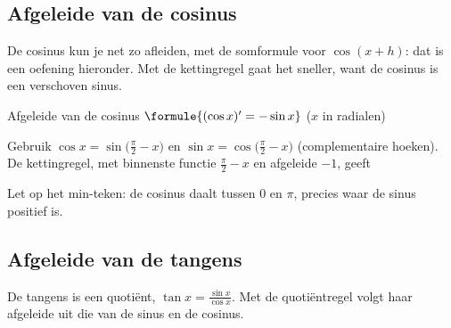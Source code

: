 \begin{oefeningen}
\end{oefeningen}

\subsection{Afgeleide van de cosinus}

De cosinus kun je net zo afleiden, met de somformule voor $\cos(x + h)$: dat is een oefening hieronder. Met de kettingregel gaat het sneller, want de cosinus is een verschoven sinus.

\begin{theorie}
\begin{stelling}{Afgeleide van de cosinus}
$\formule{(\cos x)' = -\sin x}$ \qquad ($x$ in radialen)
\end{stelling}
\begin{bewijs}
Gebruik $\cos x = \sin\bigl(\frac{\pi}{2} - x\bigr)$ en $\sin x = \cos\bigl(\frac{\pi}{2} - x\bigr)$ (complementaire hoeken). De kettingregel, met binnenste functie $\frac{\pi}{2} - x$ en afgeleide $-1$, geeft
\end{bewijs}
\end{theorie}

Let op het min-teken: de cosinus daalt tussen $0$ en $\pi$, precies waar de sinus positief is.


\begin{oefeningen}
\end{oefeningen}

\subsection{Afgeleide van de tangens}

De tangens is een quotiënt, $\tan x = \frac{\sin x}{\cos x}$. Met de quotiëntregel volgt haar afgeleide uit die van de sinus en de cosinus.

